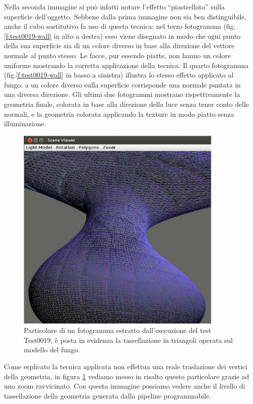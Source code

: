 Nella seconda immagine si pu\`o infatti notare l'effetto ``piastrellato'' sulla superficie dell'oggetto. Sebbene dalla prima immagine non sia ben distinguibile, anche il cubo sostitutivo fa uso di questa tecnica: nel terzo fotogramma (fig.\ref{f:test0019-wall} in alto a destra) esso viene disegnato in modo che ogni punto della sua superficie sia di un colore diverso in base alla direzione del vettore normale al punto stesso. Le facce, pur essendo piatte, non hanno un colore uniforme mostrando la corretta applicazione della tecnica. Il quarto fotogramma (fig.\ref{f:test0019-wall} in basso a sinistra) illustra lo stesso effetto applicato al fungo: a un colore diverso sulla superficie corrisponde una normale puntata in una diversa direzione. Gli ultimi due fotogrammi mostrano rispettivamente la geometria finale, colorata in base alla direzione della luce senza tener conto delle normali, e la geometria colorata applicando la texture in modo piatto senza illuminazione.

\begin{figure}
\begin{center}
\includegraphics[width=10cm]{Immagini/test0019/test0019-tessel}
\caption[Tassellazione della geometria usata nel Test0019.]{Particolare di un fotogramma estratto dall'esecuzione del test Test0019, \`e posta in evidenza la tassellazione in triangoli operata sul modello del fungo. \label{f:test0019-tessel}} 
\end{center} 
\end{figure}
Come esplicato la tecnica applicata non effettua una reale traslazione dei vertici della geometria, in figura \ref{f:test0019-tessel} vediamo messo in risalto questo particolare grazie ad uno zoom ravvicinato. Con questa immagine possiamo vedere anche il livello di tassellazione della geometria generata dalla pipeline programmabile.

